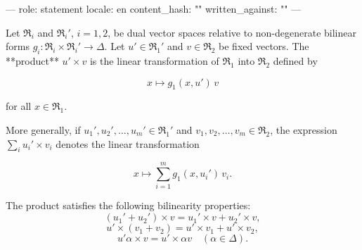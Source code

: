 ---
role: statement
locale: en
content_hash: ""
written_against: ""
---

Let $\mathfrak{R}_i$ and $\mathfrak{R}_i'$, $i = 1, 2$, be dual vector spaces relative to non-degenerate bilinear forms $g_i : \mathfrak{R}_i \times \mathfrak{R}_i' \to \Delta$. Let $u' \in \mathfrak{R}_1'$ and $v \in \mathfrak{R}_2$ be fixed vectors. The **product** $u' \times v$ is the linear transformation of $\mathfrak{R}_1$ into $\mathfrak{R}_2$ defined by

$$x \mapsto g_1(x, u')\, v$$

for all $x \in \mathfrak{R}_1$.

More generally, if $u_1', u_2', \dots, u_m' \in \mathfrak{R}_1'$ and $v_1, v_2, \dots, v_m \in \mathfrak{R}_2$, the expression $\sum_i u_i' \times v_i$ denotes the linear transformation

$$x \mapsto \sum_{i=1}^m g_1(x, u_i')\, v_i.$$

The product satisfies the following bilinearity properties:
$$(u_1' + u_2') \times v = u_1' \times v + u_2' \times v,$$
$$u' \times (v_1 + v_2) = u' \times v_1 + u' \times v_2,$$
$$u' \alpha \times v = u' \times \alpha v \quad (\alpha \in \Delta).$$
